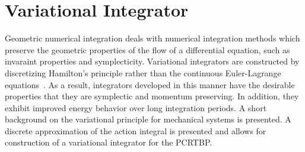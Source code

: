 \documentclass[letterpaper, paper,11pt]{AAS}		%
\begin{document}
\section{Variational Integrator}\label{sec:discrete_var}
Geometric numerical integration deals with numerical integration methods which preserve the geometric properties of the flow of a differential equation, such as invaraint properties and symplecticity.
Variational integrators are constructed by discretizing Hamilton's principle rather than the continuous Euler-Lagrange equations~\cite{marsden2001}.
As a result, integrators developed in this manner have the desirable properties that they are symplectic and momentum preserving.
In addition, they exhibit improved energy behavior over long integration periods.
A short background on the variational principle for mechanical systems is presented. 
A discrete approximation of the action integral is presented and allows for construction of a variational integrator for the PCRTBP.
\end{document}
